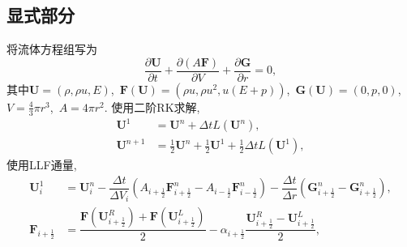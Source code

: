 \documentclass[a4paper, 11pt]{ctexart}
\numberwithin{equation}{section}
\numberwithin{figure}{section}
\newcommand\bF{\boldsymbol{F}}
\newcommand\bG{\boldsymbol{G}}
\newcommand\bU{\boldsymbol{U}}
\newcommand\pd[2]{\dfrac{\partial {#1}}{\partial {#2}}}
\begin{document}
\subsection{显式部分}
将流体方程组写为
\begin{equation}
  \pd{\bU}{t}+\pd{(A\bF)}{V}+\pd{\bG}{r}=0,
\end{equation}
其中$\bU=(\rho,\rho u,E)$,~$\bF(\bU)=(\rho u,\rho
u^2,u(E+p))$,~$\bG(\bU)=(0,p,0)$,~$V=\frac43\pi r^3$,~$A=4\pi r^2$.
使用二阶RK求解,
\begin{align}
  \bU^1&=\bU^n+\Delta tL(\bU^n),\\
  \bU^{n+1}&=\frac12\bU^n+\frac12\bU^1+\frac12\Delta tL(\bU^{1}),
\end{align}
使用LLF通量,
\begin{align}
  \bU^1_i&=\bU^n_i-\dfrac{\Delta t}{\Delta V_i}(A_{i+\frac12}\bF^n_{i+\frac12}
  -A_{i-\frac12}\bF^n_{i-\frac12})-\dfrac{\Delta t}{\Delta
  r}(\bG^n_{i+\frac12}-\bG^n_{i+\frac12}),\\
  \bF_{i+\frac12}&=\dfrac{\bF(\bU^R_{i+\frac12})+\bF(\bU^L_{i+\frac12})}{2}
  -\alpha_{i+\frac12}\dfrac{\bU^R_{i+\frac12}-\bU^L_{i+\frac12}}{2},
\end{align}
\end{document}
